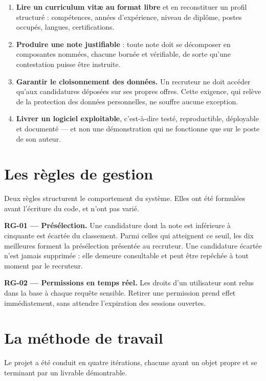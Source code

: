 \documentclass[12pt,a4paper]{report}
\begin{document}
\begin{enumerate}
  \item \textbf{Lire un curriculum vitæ au format libre} et en reconstituer un
        profil structuré : compétences, années d'expérience, niveau de
        diplôme, postes occupés, langues, certifications.
  \item \textbf{Produire une note justifiable} : toute note doit se décomposer
        en composantes nommées, chacune bornée et vérifiable, de sorte qu'une
        contestation puisse être instruite.
  \item \textbf{Garantir le cloisonnement des données.} Un recruteur ne doit
        accéder qu'aux candidatures déposées sur ses propres offres. Cette
        exigence, qui relève de la protection des données personnelles, ne
        souffre aucune exception.
  \item \textbf{Livrer un logiciel exploitable}, c'est-à-dire testé,
        reproductible, déployable et documenté --- et non une démonstration
        qui ne fonctionne que sur le poste de son auteur.
\end{enumerate}

\section{Les règles de gestion}

Deux règles structurent le comportement du système. Elles ont été formulées
avant l'écriture du code, et n'ont pas varié.

\textbf{RG-01 --- Présélection.} Une candidature dont la note est inférieure à
cinquante est écartée du classement. Parmi celles qui atteignent ce seuil, les
dix meilleures forment la présélection présentée au recruteur. Une candidature
écartée n'est jamais supprimée : elle demeure consultable et peut être
repêchée à tout moment par le recruteur.

\textbf{RG-02 --- Permissions en temps réel.} Les droits d'un utilisateur sont
relus dans la base à chaque requête sensible. Retirer une permission prend
effet immédiatement, sans attendre l'expiration des sessions ouvertes.

\section{La méthode de travail}

Le projet a été conduit en quatre itérations, chacune ayant un objet propre et
se terminant par un livrable démontrable.
\end{document}
